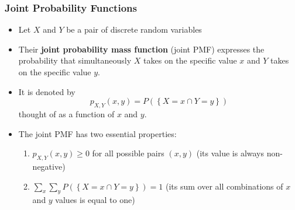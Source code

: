 \documentclass[notes=show,handout]{beamer}\usepackage[]{graphicx}\usepackage[]{color}
\newenvironment{stepenumerate}{\begin{enumerate}[<+->]}{\end{enumerate}}
\newenvironment{stepitemize}{\begin{itemize}[<+->]}{\end{itemize} }
\renewcommand{\Pr}{P}
\begin{document}


\begin{frame}
\frametitle{Joint Probability Functions}

\begin{stepitemize}
\item Let $X$ and $Y$ be a pair of discrete random variables

\item Their  \textbf{joint probability mass function} (joint
PMF) expresses the probability that simultaneously $X$ takes on the specific
value $x$ and $Y$ takes on the specific value $y$.

\item It is denoted by
\begin{equation*}
p_{X,Y}\left( x,y\right) =\Pr (\left\{ X=x\cap Y=y\right\})
\end{equation*}
thought of as a function of $x$ and $y$.

\item The joint PMF has two essential properties:

\begin{stepenumerate}
\item $p_{X,Y}\left( x,y\right) \geq 0$ for all possible pairs $\left(
x,y\right) $ (its value is always non-negative)

\item $\sum_{x}\sum_{y}\Pr ( \left\{ X=x\cap Y=y\right\}) =1$ (its sum over all
combinations of $x$ and $y$ values is equal to one)
\end{stepenumerate}
\end{stepitemize}

\end{frame}%
\end{document}
